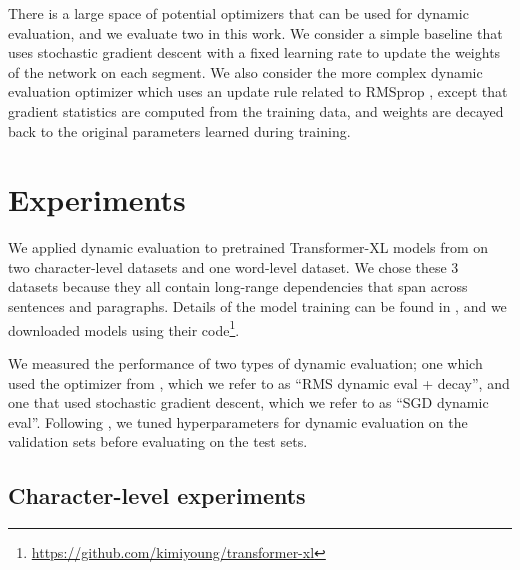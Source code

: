 \documentclass{article} \usepackage{iclr2018_conference,times}
\begin{document}
There is a large space of potential optimizers that can be used for dynamic evaluation, and we evaluate two in this work. We consider a simple baseline that uses stochastic gradient descent with a fixed learning rate to update the weights of the network on each segment. We also consider the more complex dynamic evaluation optimizer \citep{krause2018} which uses an update rule related to RMSprop \citep{tieleman2012}, except that gradient statistics are computed from the training data, and weights are decayed back to the original parameters learned during training.


\section{Experiments}

We applied dynamic evaluation to pretrained Transformer-XL models from \citet{dai2019} on two character-level datasets and one word-level dataset. We chose these 3 datasets because they all contain long-range dependencies that span across sentences and paragraphs. Details of the model training can be found in \citet{dai2019}, and we downloaded models using their code\footnote{\url{https://github.com/kimiyoung/transformer-xl}}.


We measured the performance of two types of dynamic evaluation; one which used the optimizer from \citet{krause2018}, which we refer to as ``RMS dynamic eval + decay'', and one that used stochastic gradient descent, which we refer to as ``SGD dynamic eval''. Following \citet{krause2018}, we tuned hyperparameters for dynamic evaluation on the validation sets before evaluating on the test sets.



\subsection{Character-level experiments}
\label{sec:clexpt}
\end{document}
